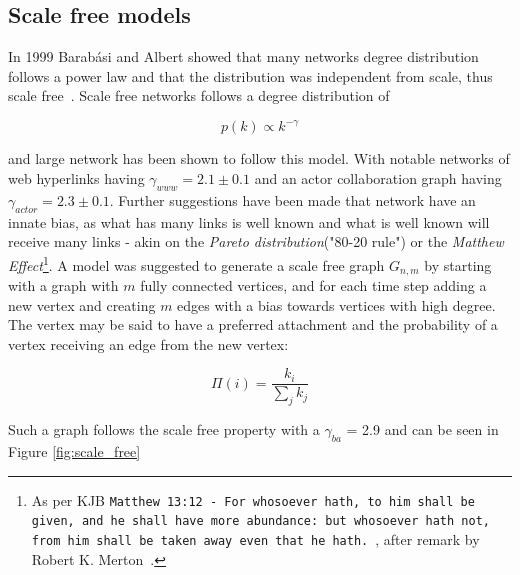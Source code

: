 


\subsection{Scale free models}

In 1999 Barabási and Albert showed that many networks \gls{degree distribution} follows a power law and that the distribution was independent from scale, thus scale free~\cite{barabasi:albert:emergent:scaling}. Scale free networks follows a degree distribution of

\begin{equation}
	 p(k) \propto k^{-\gamma} 
	\label{eq:scale:free}
\end{equation}

and large network has been shown to follow this model. With notable networks of web hyperlinks having $\gamma_{www} = 2.1\pm 0.1$ and an actor collaboration graph having $\gamma_{actor} = 2.3\pm0.1$. Further suggestions have been made that network have an innate bias, as what has many links is well known and what is well known will receive many links - akin on the \textit{Pareto distribution}("80-20 rule") or the \textit{Matthew Effect}\footnote{As per KJB \texttt{Matthew 13:12 - For whosoever hath, to him shall be given, and he shall have more abundance: but whosoever hath not, from him shall be taken away even that he hath.}~\cite{king:james:bible}, after remark by Robert K. Merton~\cite{merton:matthew:effect}. }. 
A model was suggested to generate a scale free graph $G_{n, m}$ by starting with a graph with $m$ fully connected vertices, and for each time step adding a new vertex and creating $m$ edges with a bias towards vertices with high degree. The vertex may be said to have a preferred attachment and the probability of a vertex receiving an edge from the new vertex:

\[ \Pi(i) = \dfrac{k_i}{\sum_{j}^{}k_j} \]

Such a graph follows the scale free property with a $\gamma_{ba}$ = 2.9 and can be seen in Figure \ref{fig:scale_free}

